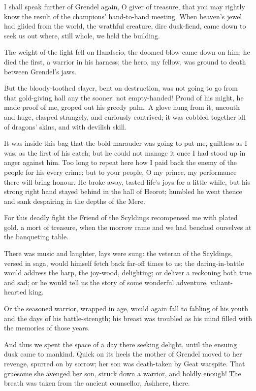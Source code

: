 \documentclass[a4paper]{article}
\begin{document}
{I shall speak further
of Grendel again, O giver of treasure,
that you may rightly know the result of the champions’
hand-to-hand meeting. When heaven’s jewel
had glided from the world, the wrathful creature,
dire dusk-fiend, came down to seek us out
where, still whole, we held the building.

The weight of the fight fell on Handscio,
the doomed blow came down on him; he died the first,
a warrior in his harness; the hero, my fellow,
was ground to death between Grendel’s jaws.

But the bloody-toothed slayer, bent on destruction,
was not going to go from that gold-giving hall
any the sooner: not empty-handed!
Proud of his might, he made proof of me,
groped out his greedy palm. A glove hung from it,
uncouth and huge, clasped strangely,
and curiously contrived; it was cobbled together
all of dragons’ skins, and with devilish skill.

It was inside this bag that the bold marauder
was going to put me, guiltless as I was,
as the first of his catch; but he could not manage it
once I had stood up in anger against him.
Too long to repeat here how I paid back
the enemy of the people for his every crime;
but to your people, O my prince, my performance there
will bring honour. He broke away,
tasted life’s joys for a little while,
but his strong right hand stayed behind
in the hall of Heorot; humbled he went thence
and sank despairing in the depths of the Mere.

For this deadly fight the Friend of the Scyldings
recompensed me with plated gold,
a mort of treasure, when the morrow came
and we had benched ourselves at the banqueting table.

There was music and laughter, lays were sung:
the veteran of the Scyldings, versed in saga,
would himself fetch back far-off times to us;
the daring-in-battle would address the harp,
the joy-wood, delighting; or deliver a reckoning
both true and sad; or he would tell us the story
of some wonderful adventure, valiant-hearted king.

Or the seasoned warrior, wrapped in age,
would again fall to fabling of his youth
and the days of his battle-strength; his breast was troubled
as his mind filled with the memories of those years.

And thus we spent the space of a day there
seeking delight, until the ensuing dusk
came to mankind. Quick on its heels
the mother of Grendel moved to her revenge,
spurred on by sorrow; her son was death-taken
by Geat warspite. That gruesome she
avenged her son, struck down a warrior,
and boldly enough! The breath was taken
from the ancient counsellor, Ashhere, there.

}
\end{document}
